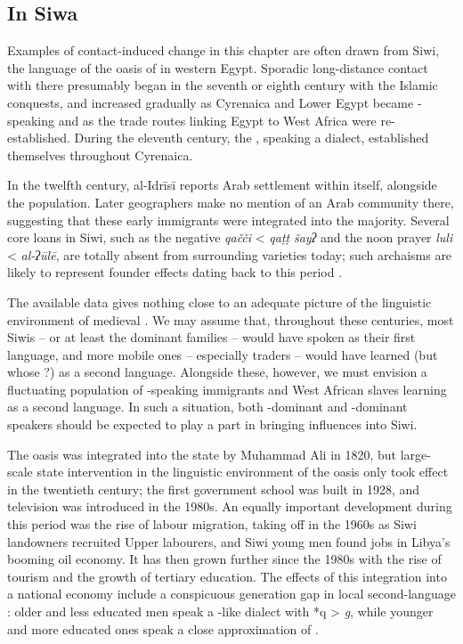 \documentclass[output=paper]{langsci/langscibook}
\begin{document}
 
 \subsection{In Siwa}


Examples of contact-induced change in this chapter are often drawn from Siwi, the  language of the oasis of  in western Egypt. Sporadic long-distance contact with  there presumably began in the seventh or eighth century with the Islamic conquests, and increased gradually as Cyrenaica and Lower Egypt became -speaking and as the trade routes linking Egypt to West Africa were re-established.  During the eleventh century, the , speaking a   dialect, established themselves throughout Cyrenaica.

In the twelfth century, al-Idrīsī reports Arab settlement within  itself, alongside the  population. Later geographers make no mention of an Arab community there, suggesting that these early immigrants were integrated into the  majority. Several core  loans in Siwi, such as the negative  \textit{qačči} < \textit{qaṭṭ} \textit{šayʔ} and the noon prayer \textit{luli} < \textit{al-ʔūlē}, are totally absent from surrounding  varieties today; such archaisms are likely to represent founder effects dating back to this period \citep{Souag2009}.  

The available data gives nothing close to an adequate picture of the linguistic environment of medieval . We may assume that, throughout these centuries, most Siwis – or at least the dominant families – would have spoken  as their first language, and more mobile ones – especially traders – would have learned  (but whose ?) as a second language. Alongside these, however, we must envision a fluctuating population of -speaking immigrants and West African slaves learning  as a second language. In such a situation, both -dominant and -dominant speakers should be expected to play a part in bringing  influences into Siwi.

The oasis was integrated into the  state by Muhammad Ali in 1820, but large-scale state intervention in the linguistic environment of the oasis only took effect in the twentieth century; the first government school was built in 1928, and television was introduced in the 1980s. An equally important development during this period was the rise of labour migration, taking off in the 1960s as Siwi landowners recruited Upper  labourers, and Siwi young men found jobs in Libya's booming oil economy. It has then grown further since the 1980s with the rise of tourism and the growth of tertiary education. The effects of this integration into a national economy include a conspicuous generation gap in local second-language : older and less educated men speak a -like dialect with *q > \textit{g}, while younger and more educated ones speak a close approximation of  .
\end{document}

